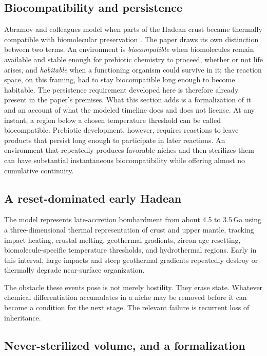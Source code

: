 \documentclass[11pt]{article}
\theoremstyle{definition}
\begin{document}
\subsection{Biocompatibility and persistence}

Abramov and colleagues model when parts of the Hadean crust became thermally compatible with biomolecular preservation \cite{abramov}. The paper draws its own distinction between two terms. An environment is \emph{biocompatible} when biomolecules remain available and stable enough for prebiotic chemistry to proceed, whether or not life arises, and \emph{habitable} when a functioning organism could survive in it; the reaction space, on this framing, had to stay biocompatible long enough to become habitable. The persistence requirement developed here is therefore already present in the paper's premises. What this section adds is a formalization of it and an account of what the modeled timeline does and does not license. At any instant, a region below a chosen temperature threshold can be called biocompatible. Prebiotic development, however, requires reactions to leave products that persist long enough to participate in later reactions. An environment that repeatedly produces favorable niches and then sterilizes them can have substantial instantaneous biocompatibility while offering almost no cumulative continuity.

\subsection{A reset-dominated early Hadean}

The model represents late-accretion bombardment from about 4.5 to 3.5\,Ga using a three-dimensional thermal representation of crust and upper mantle, tracking impact heating, crustal melting, geothermal gradients, zircon age resetting, biomolecule-specific temperature thresholds, and hydrothermal regions. Early in this interval, large impacts and steep geothermal gradients repeatedly destroy or thermally degrade near-surface organization.

The obstacle these events pose is not merely hostility. They erase state. Whatever chemical differentiation accumulates in a niche may be removed before it can become a condition for the next stage. The relevant failure is recurrent loss of inheritance.

\subsection{Never-sterilized volume, and a formalization}
\end{document}
